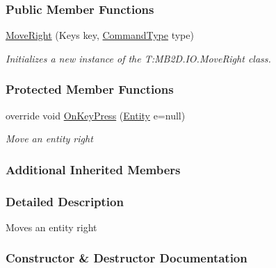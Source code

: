 \subsubsection*{Public Member Functions}
\begin{DoxyCompactItemize}
\item 
\hyperlink{class_m_b2_d_1_1_i_o_1_1_move_right_a95c80b11d5db82f6c5dbed17883cfa7e}{Move\+Right} (Keys key, \hyperlink{namespace_m_b2_d_1_1_i_o_ab5f95f3fe9e652778b62bdf943168a68}{Command\+Type} type)
\begin{DoxyCompactList}\small\item\em Initializes a new instance of the T\+:\+M\+B2\+D.\+I\+O.\+Move\+Right class. \end{DoxyCompactList}\end{DoxyCompactItemize}
\subsubsection*{Protected Member Functions}
\begin{DoxyCompactItemize}
\item 
override void \hyperlink{class_m_b2_d_1_1_i_o_1_1_move_right_aa0d9913727d27d01dff4fdd394e2f6f4}{On\+Key\+Press} (\hyperlink{class_m_b2_d_1_1_entity_component_1_1_entity}{Entity} e=null)
\begin{DoxyCompactList}\small\item\em Move an entity right \end{DoxyCompactList}\end{DoxyCompactItemize}
\subsubsection*{Additional Inherited Members}


\subsubsection{Detailed Description}
Moves an entity right 



\subsubsection{Constructor \& Destructor Documentation}
\hypertarget{class_m_b2_d_1_1_i_o_1_1_move_right_a95c80b11d5db82f6c5dbed17883cfa7e}{}\label{class_m_b2_d_1_1_i_o_1_1_move_right_a95c80b11d5db82f6c5dbed17883cfa7e} 
